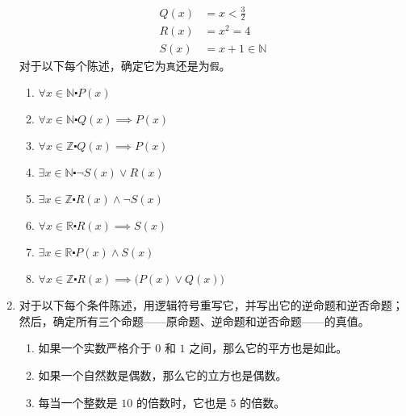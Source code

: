 \begin{enumerate}[label=(\arabic*)]
\begin{align*}
            Q(x) &= x < \frac{3}{2} \\
            R(x) &= x^2 = 4 \\
            S(x) &= x + 1 \in \mathbb{N} 
        \end{align*}
        对于以下每个陈述，确定它为\verb|真|还是为\verb|假|。
        \begin{enumerate}[label=(\alph*)]
            \item $\forall x \in \mathbb{N} \centerdot P(x)$
            \item $\forall x \in \mathbb{N} \centerdot Q(x) \implies P(x)$
            \item $\forall x \in \mathbb{Z} \centerdot Q(x) \implies P(x)$
            \item $\exists x \in \mathbb{N} \centerdot \neg S(x) \lor R(x)$
            \item $\exists x \in \mathbb{Z} \centerdot R(x) \land \neg S(x)$
            \item $\forall x \in \mathbb{R} \centerdot R(x) \implies S(x)$
            \item $\exists x \in \mathbb{R} \centerdot P(x) \land S(x)$
            \item $\forall x \in \mathbb{Z} \centerdot R(x) \implies \big(P(x) \lor Q(x)\big)$
        \end{enumerate}
    \item 对于以下每个条件陈述，用逻辑符号重写它，并写出它的逆命题和逆否命题；然后，确定所有三个命题——原命题、逆命题和逆否命题——的真值。
        \begin{enumerate}[label=(\alph*)]
            \item 如果一个实数严格介于 $0$ 和 $1$ 之间，那么它的平方也是如此。
            \item 如果一个自然数是偶数，那么它的立方也是偶数。
            \item 每当一个整数是 $10$ 的倍数时，它也是 $5$ 的倍数。
        \end{enumerate}
\end{enumerate}